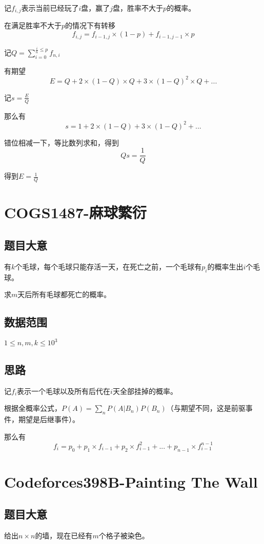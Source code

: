 \documentclass{ctexart}
\numberwithin{equation}{section}
\begin{document}
\begin{flushleft}
  记$f_{i,j}$表示当前已经玩了$i$盘，赢了$j$盘，胜率不大于$p$的概率。

  在满足胜率不大于$p$的情况下有转移$$f_{i,j}=f_{i-1,j}\times (1-p)+f_{i-1,j-1}\times p$$

  记$Q=\sum\limits_{i=0}^{\frac{i}{n}\le p} f_{n,i}$

  有期望$$E=Q+2\times (1-Q)\times Q+3\times (1-Q)^2\times Q+...$$

  记$s=\frac{E}{Q}$

  那么有$$s=1+2\times (1-Q)+3\times (1-Q)^2+...$$

  错位相减一下，等比数列求和，得到$$Qs=\frac{1}{Q}$$

  得到$E=\frac{1}{Q}$

  \section{COGS1487-麻球繁衍}
  \subsection{题目大意}
  有$k$个毛球，每个毛球只能存活一天，在死亡之前，一个毛球有$p_i$的概率生出$i$个毛球。

  求$m$天后所有毛球都死亡的概率。

  \subsection{数据范围}
  $1\le n,m,k \le 10^3$
  \subsection{思路}
  
  记$f_i$表示一个毛球以及所有后代在$i$天全部挂掉的概率。

  根据全概率公式，$P(A)=\sum_n P(A|B_n)P(B_n)$（与期望不同，这是前驱事件，期望是后继事件）。

  那么有$$f_i=p_0+p_1\times f_{i-1}+p_2\times f_{i-1}^2+...+p_{n-1}\times f_{i-1}^{n-1}$$

  \newpage

  \section{Codeforces398B-Painting The Wall}
  \subsection{题目大意}
  给出$n\times n$的墙，现在已经有$m$个格子被染色。


\end{flushleft}
\end{document}
